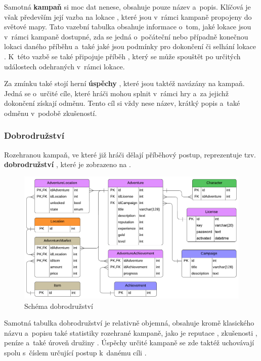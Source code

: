Samotná \textbf{kampaň}  si moc dat nenese, obsahuje pouze název a~popis. Klíčová je však především její vazba na lokace , které jsou v~rámci kampaně propojeny do světové mapy. Tato vazební tabulka obsahuje informace o~tom, jaké lokace jsou v~rámci kampaně dostupné, zda se jedná o~počáteční  nebo případně konečnou  lokaci daného příběhu a~také jaké jsou podmínky pro dokončení či selhání lokace . K~této vazbě se také připojuje příběh , který se může spouštět po určitých událostech odehraných v~rámci lokace.

Za zmínku také stojí herní \textbf{úspěchy} , které jsou taktéž navázány na kampaň. Jedná se o~určité cíle, které hráči mohou splnit v~rámci hry a~za jejichž dokončení získají odměnu. Tento cíl si vždy nese název, krátký popis a~také odměnu v~podobě zkušeností.


\subsubsection*{Dobrodružství}
\label{subsubsec:schema_adventure}

Rozehranou kampaň, ve které již hráči dělají příběhový postup, reprezentuje tzv. \textbf{dobrodružství} , které je zobrazeno na .

\begin{figure}[h]
    \centering
    \includegraphics[scale=0.8]{../../shared/diagrams/er_adventure.pdf}
    \caption{Schéma dobrodružství}
    \label{diag:er_adventure}
\end{figure}

Samotná tabulka dobrodružství je relativně objemná, obsahuje kromě klasického názvu a~popisu také statistiky rozehrané kampaně, jako je reputace , zkušenosti , peníze  a~také úroveň družiny . Úspěchy určité kampaně  se zde taktéž uchovávají spolu s~číslem určující postup k~danému cíli .

